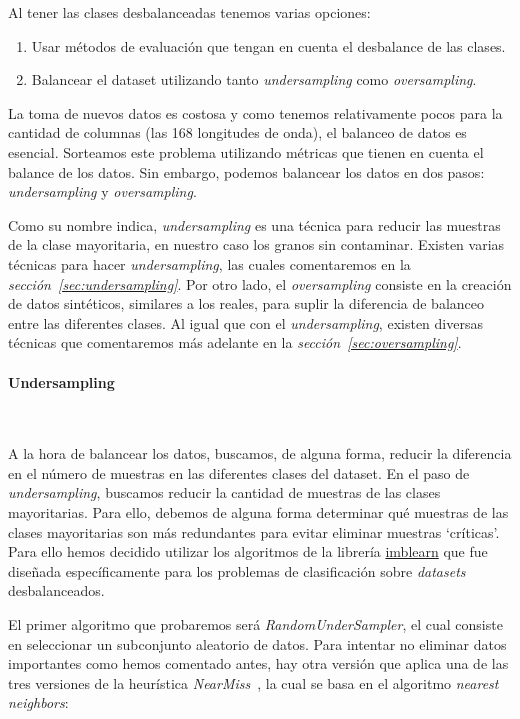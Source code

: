 Al tener las clases desbalanceadas tenemos varias opciones:
\begin{enumerate}
    \item Usar métodos de evaluación que tengan en cuenta el desbalance de las clases.
    \item Balancear el \gls{dataset} utilizando tanto \textit{undersampling} como \textit{oversampling}.
\end{enumerate}

La toma de nuevos datos es costosa y como tenemos relativamente pocos para la cantidad de columnas (las 168 longitudes de onda), el balanceo de datos es esencial. Sorteamos este problema utilizando métricas que tienen en cuenta el balance de los datos. Sin embargo, podemos balancear los datos en dos pasos: \textit{undersampling} y \textit{oversampling}. 

Como su nombre indica, \textit{undersampling} es una técnica para reducir las muestras de la clase mayoritaria, en nuestro caso los granos sin contaminar. Existen varias técnicas para hacer \textit{undersampling}, las cuales comentaremos en la \textit{sección\ \ref{sec:undersampling}}. Por otro lado, el \textit{oversampling} consiste en la creación de datos sintéticos, similares a los reales, para suplir la diferencia de balanceo entre las diferentes clases. Al igual que con el \textit{undersampling}, existen diversas técnicas que comentaremos más adelante en la \textit{sección\ \ref{sec:oversampling}}.

\paragraph{Undersampling}\ \label{sec:undersampling}


A la hora de balancear los datos, buscamos, de alguna forma, reducir la diferencia en el número de muestras en las diferentes clases del dataset. En el paso de \textit{undersampling}, buscamos reducir la cantidad de muestras de las clases mayoritarias. Para ello, debemos de alguna forma determinar qué muestras de las clases mayoritarias son más redundantes para evitar eliminar muestras `críticas'. Para ello hemos decidido utilizar los algoritmos de la librería \href{https://imbalanced-learn.org/stable/}{imblearn} que fue diseñada específicamente para los problemas de clasificación sobre \textit{datasets} desbalanceados.\ \cite{3Undersa98:online}

El primer algoritmo que probaremos será \textit{RandomUnderSampler}, el cual consiste en seleccionar un subconjunto aleatorio de datos. Para intentar no eliminar datos importantes como hemos comentado antes, hay otra versión que aplica una de las tres versiones de la heurística \textit{NearMiss}\ \cite{3Undersa98:online}, la cual se basa en el algoritmo \textit{nearest neighbors}:

